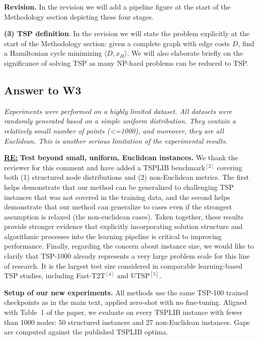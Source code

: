 \textbf{Revision.}
In the revision we will add a pipeline figure at the start of the Methodology section depicting these four stages.

\textbf{(3) TSP definition}. In the revision we will state the problem explicitly at the start of the Methodology section: given a complete graph with edge costs $D$, find a Hamiltonian cycle minimizing $\langle D,x_H\rangle$. We will also elaborate briefly on the significance of solving TSP as many NP-hard problems can be reduced to TSP. 


\subsection{Answer to W3}

\textit{Experiments were performed on a highly limited dataset. All datasets were randomly generated based on a simple uniform distribution. They contain a relatively small number of points (\textless=1000), and moreover, they are all Euclidean. This is another serious limitation of the experimental results.}

\textbf{\underline{RE:}}
\textbf{Test beyond small, uniform, Euclidean instances.}
We thank the reviewer for this comment and have added a TSPLIB benchmark$^{[2]}$ covering both (1) structured node distributions and (2) non-Euclidean metrics. The first helps demonstrate that our method can be generalized to challenging TSP instances that was not covered in the training data, and the second helps demonstrate that our method can generalize to cases even if the strongest assumption is relaxed (the non-euclidean cases). Taken together, these results provide stronger evidence that explicitly incorporating solution structure and algorithmic processes into the learning pipeline is critical to improving performance. Finally, regarding the concern about instance size, we would like to clarify that TSP-1000 already represents a very large problem scale for this line of research. It is the largest test size considered in comparable learning-based TSP studies, including Fast-T2T$^{[4]}$ and UTSP$^{[5]}$. 

\textbf{Setup of our new experiments.} All methods use the same TSP-100 trained checkpoints as in the main text, applied zero-shot with no fine-tuning. Aligned with Table~1 of the paper, we evaluate on every TSPLIB instance with fewer than 1000 nodes: 50 structured instances and 27 non-Euclidean instances. Gaps are computed against the published TSPLIB optima. 

